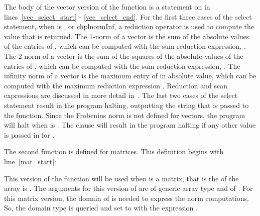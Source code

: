 The body of the vector version of the  function is a  statement on
 in lines~\ref{vec_select_start} - \ref{vec_select_end}.  
For the first three cases of the select statement,
when  is ,  or chpl{normInf},
a reduction operator is used to compute the value that is returned. 
The 1-norm of a vector is the sum of the absolute values of the entries of ,
which can be computed with the sum reduction expression, .
The 2-norm of a vector is the sum of the squares of the absolute values of
the entries of , which can be computed with the sum reduction expression,
.
The infinity norm of a vector is the maximum entry of  in absolute value,
which can be computed with the maximum reduction expression .
Reduction and scan expressions are discussed in more detail 
in~.  The last two cases of the select statement result
in the program halting, outputting the string that is passed to the 
function.  Since the Frobenius norm is not defined for vectors, the program
will halt when  is .  The  clause will
result in the program halting if any other value is passed in for .

The second  function is defined for matrices.  This definition begins
with line~\ref{mat_start}:
\begin{chapel}
  def norm(x: [?D], p: normType) where x.rank == 2 {
\end{chapel}
This version of the function will be used when  is a matrix,
that is the  of the array  is .  The arguments
for this version of  are  of generic array type and 
of .  For this matrix version, the domain of  is
needed to express the  norm computations.  So, the domain type is queried and set to 
 with the expression \chpl{[?D]}.  

